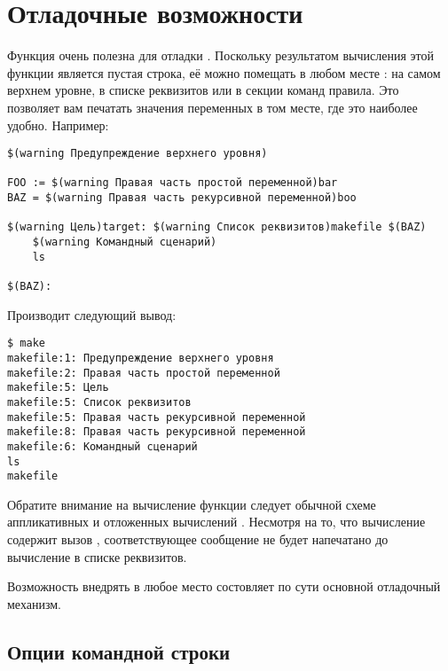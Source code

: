\section{Отладочные возможности \GNUmake{}}

Функция  очень полезна для отладки
. Поскольку результатом вычисления этой функции является
пустая строка, её можно помещать в любом месте : на самом
верхнем уровне, в списке реквизитов или в секции команд правила. Это
позволяет вам печатать значения переменных в том месте, где это
наиболее удобно. Например:

\begin{verbatim}
$(warning Предупреждение верхнего уровня)

FOO := $(warning Правая часть простой переменной)bar
BAZ = $(warning Правая часть рекурсивной переменной)boo

$(warning Цель)target: $(warning Список реквизитов)makefile $(BAZ)
    $(warning Командный сценарий)
    ls

$(BAZ):
\end{verbatim}

Производит следующий вывод:

\begin{verbatim}
$ make
makefile:1: Предупреждение верхнего уровня
makefile:2: Правая часть простой переменной
makefile:5: Цель
makefile:5: Список реквизитов
makefile:5: Правая часть рекурсивной переменной
makefile:8: Правая часть рекурсивной переменной
makefile:6: Командный сценарий
ls
makefile
\end{verbatim}

Обратите внимание на вычисление функции  следует
обычной схеме аппликативных и отложенных вычислений
\GNUmake{}. Несмотря на то, что вычисление  содержит
вызов , соответствующее сообщение не будет
напечатано до вычисление  в списке реквизитов.

Возможность внедрять  в любое место состовляет
по сути основной отладочный механизм.

\subsection{Опции командной строки}

